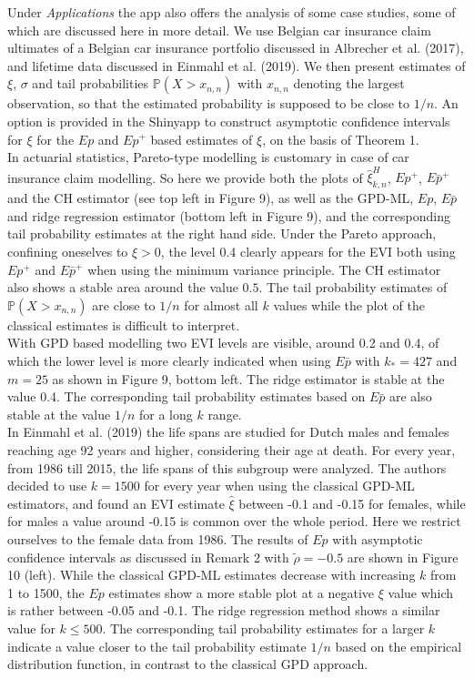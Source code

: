 \documentclass[twoside,leqno,11pt]{article}
\begin{document}
\noindent
 Under {\it Applications} the app also offers the analysis of some case studies, some of which are discussed here in more detail. We use  Belgian car insurance claim ultimates of a Belgian car insurance portfolio discussed  in Albrecher et al. (2017), and lifetime data discussed in Einmahl et al. (2019). We then present estimates of $\xi$, $\sigma$ and tail probabilities $\mathbb{P}(X>x_{n,n})$ with $x_{n,n}$ denoting the largest observation, so that the estimated probability is supposed to be close to $1/n$. An option is provided in the Shinyapp to construct asymptotic confidence intervals for $\xi$ for the $Ep$ and $Ep^+$ based estimates of $\xi$, on the basis of Theorem 1. \\
 
\noindent
In actuarial statistics, Pareto-type modelling is customary in case of car insurance claim modelling. So here we provide both the plots of $\hat{\xi}^H_{k,n}$, $Ep^+$, $E\bar{p}^+$ and the CH estimator (see top left in Figure 9), as well as the GPD-ML, $Ep$, $E\bar{p}$ and ridge regression estimator (bottom left in Figure 9), and the corresponding tail probability estimates at the right hand side. Under the Pareto approach, confining oneselves to $\xi >0$, the level 0.4 clearly appears for the EVI both using $Ep^+$ and $E\bar{p}^+$ when using the minimum variance principle. The CH estimator also shows a stable area around the value $0.5$.
The tail probability estimates of $\mathbb{P}(X>x_{n,n})$ are close to $1/n$ for almost all $k$ values while the plot of the classical estimates is difficult to interpret. 
\\
With GPD based modelling two EVI levels are visible, around 0.2 and 0.4, of which the lower level is more clearly indicated when using $E\bar{p}$  with $k_*=427$ and $m=25$ as shown in Figure 9, bottom left. The ridge estimator is stable at the value 0.4. The corresponding tail probability estimates based on $E\bar{p}$  are also stable at the value $1/n$ for a long $k$ range. \\

\noindent
In Einmahl et al. (2019) the life spans are studied for Dutch males and females reaching age 92 years and higher,  considering their age at death. For every year, from 1986 till 2015,  the life spans of this subgroup were analyzed. The authors decided to use $k=1500$ for every year when using the classical GPD-ML estimators, and found an EVI estimate  $\hat\xi$ between -0.1 and -0.15 for females, while for males a value around -0.15 is common over the whole period. Here we restrict ourselves to the female data from 1986. The results of $Ep$ with asymptotic confidence intervals as discussed in Remark 2 with $\tilde\rho=-0.5$ are shown in Figure 10 (left). While the classical GPD-ML estimates decrease with increasing $k$ from 1 to 1500,  
the $Ep$ estimates  show a more stable plot at a negative $\xi$ value which is rather between -0.05 and -0.1. The ridge regression method shows a similar value for $k \leq 500$. The corresponding tail probability estimates for a larger $k$  indicate a value closer to the tail probability estimate $1/n$ based on the empirical distribution function, in contrast to the classical GPD approach. 
\end{document}
